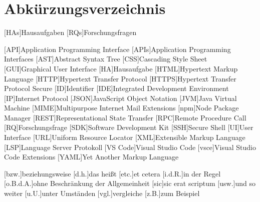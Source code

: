\chapter*{Abkürzungsverzeichnis}


[HAs]{Hausaufgaben}
[RQs]{Forschungsfragen}

\begin{acronym}[XXXXXX] %
    [API]{Application Programming Interface}
    [APIs]{Application Programming Interfaces}
    [AST]{Abstract Syntax Tree}
    [CSS]{Cascading Style Sheet}
    [GUI]{Graphical User Interface}
    [HA]{Hausaufgabe}
    [HTML]{Hypertext Markup Language}
    [HTTP]{Hypertext Transfer Protocol}
    [HTTPS]{Hypertext Transfer Protocol Secure}
    [ID]{Identifier}
    [IDE]{Integrated Development Environment}
    [IP]{Internet Protocol}
    [JSON]{JavaScript Object Notation}
    [JVM]{Java Virtual Machine}
    [MIME]{Multipurpose Internet Mail Extensions}
    [npm]{Node Package Manager}
    [REST]{Representational State Transfer}
    [RPC]{Remote Procedure Call}
    [RQ]{Forschungsfrage}
    [SDK]{Software Development Kit}
    [SSH]{Secure Shell}
    [UI]{User Interface}
    [URL]{Uniform Resource Locator}
    [XML]{Extensible Markup Language}
    [LSP]{Language Server Protokoll}
    [VS Code]{Visual Studio Code}
    [vsce]{Visual Studio Code Extensions}
    [YAML]{Yet Another Markup Language}

    \vspace{\parskip}

    [bzw.]{beziehungsweise}
    [d.h.]{das heißt}
    [etc.]{et cetera}
    [i.d.R.]{in der Regel}
    [o.B.d.A.]{ohne Beschränkung der Allgemeinheit}
    [sic]{sic erat scriptum}
    [usw.]{und so weiter}
    [u.U.]{unter Umständen}
    [vgl.]{vergleiche}
    [z.B.]{zum Beispiel}
\end{acronym}

